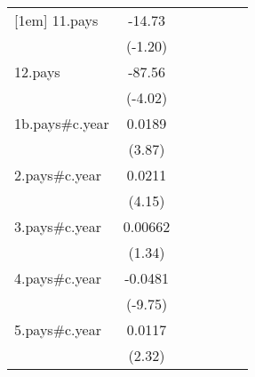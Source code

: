 {\begin{tabular}{l*{6}{c}}
[1em]
11.pays             &      -14.73         &                     &                     &                     &                     &                     \\
                    &     (-1.20)         &                     &                     &                     &                     &                     \\
[1em]
12.pays             &      -87.56\sym{***}&                     &                     &                     &                     &                     \\
                    &     (-4.02)         &                     &                     &                     &                     &                     \\
[1em]
1b.pays#c.year      &      0.0189\sym{***}&                     &                     &                     &                     &                     \\
                    &      (3.87)         &                     &                     &                     &                     &                     \\
[1em]
2.pays#c.year       &      0.0211\sym{***}&                     &                     &                     &                     &                     \\
                    &      (4.15)         &                     &                     &                     &                     &                     \\
[1em]
3.pays#c.year       &     0.00662         &                     &                     &                     &                     &                     \\
                    &      (1.34)         &                     &                     &                     &                     &                     \\
[1em]
4.pays#c.year       &     -0.0481\sym{***}&                     &                     &                     &                     &                     \\
                    &     (-9.75)         &                     &                     &                     &                     &                     \\
[1em]
5.pays#c.year       &      0.0117\sym{*}  &                     &                     &                     &                     &                     \\
                    &      (2.32)         &                     &                     &                     &                     &                     \\

\end{tabular}}
